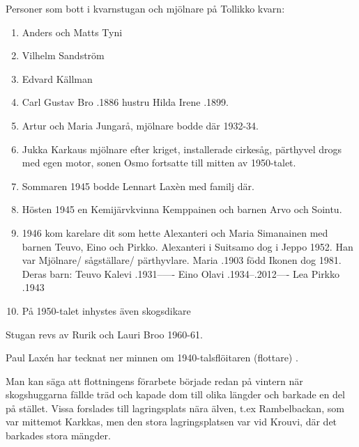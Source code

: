 Personer som bott i kvarnstugan och mjölnare på Tollikko kvarn:
\begin{enumerate}
  \item Anders och Matts Tyni
  \item Vilhelm Sandström
  \item Edvard Källman
  \item Carl Gustav Bro .1886 hustru Hilda Irene .1899.
  \item Artur och Maria Jungarå, mjölnare bodde där 1932-34.
  \item Jukka Karkaus mjölnare efter kriget, installerade cirkesåg, pärthyvel drogs med egen motor, sonen Osmo fortsatte till mitten av 1950-talet.
  \item Sommaren 1945 bodde Lennart Laxèn med familj där.
  \item Hösten 1945 en Kemijärvkvinna Kemppainen och barnen Arvo och Sointu.
  \item 1946 kom karelare dit som hette Alexanteri och Maria Simanainen med barnen Teuvo, Eino och Pirkko.
  Alexanteri  i Suitsamo dog i Jeppo 1952. Han var Mjölnare/ sågställare/ pärthyvlare.
  Maria .1903 född Ikonen dog 1981. Deras barn: Teuvo Kalevi .1931------ Eino Olavi .1934--.2012---- Lea Pirkko .1943
  \item På 1950-talet inhystes även skogsdikare
\end{enumerate}
Stugan revs av Rurik och Lauri Broo 1960-61.


%

Paul Laxén har tecknat ner minnen om 1940-talsflöitaren (flottare) .

Man kan säga att flottningens förarbete började redan på vintern när skogshuggarna fällde träd och kapade dom till olika längder och barkade en del på stället. Vissa forslades till lagringsplats nära älven, t.ex Rambelbackan, som var mittemot Karkkas, men den stora lagringsplatsen var vid Krouvi, där det barkades stora mängder.


